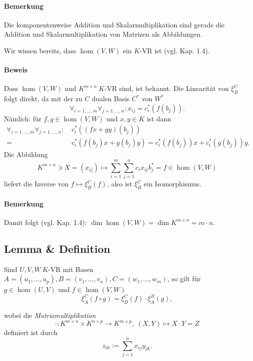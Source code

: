 \paragraph{Bemerkung}
	Die komponentenweise Addition und Skalarmultiplikation sind gerade die Addition und Skalarmultiplikation von Matrizen als Abbildungen.
	
	Wir wissen bereits, dass $ \hom(V,W) $ ein $ K $-VR ist (vgl. Kap. 1.4).
\paragraph{Beweis}
	Dass $ \hom(V,W) $ und $ K^{m\times n} \ K $-VR sind, ist bekannt. Die Linearität von $ \xi_B^C $ folgt direkt, da mit der zu $ C $ dualen Basis $ C^* $ von $ W^* $
		\[ \forall_{i=1,\dots,m} \forall_{j=1,\dots,n}: x_{ij}= c_i^*(f(b_j)). \]
	Nämlich: für $ f,g\in \hom(V,W) $ und $ x,y\in K $ ist dann
		\begin{align*}
			\forall_{i= 1,\dots,m} \forall_{j=1,\dots, n} :\ &c_i^*((fx+gy)(b_j))\\
			=\ &c_i^*(f(b_j)x+g(b_j)y) = c_i^*(f(b_j))x+c_i^*(g(b_j))y.
		\end{align*}
	Die Abbildung
		\[ K^{m\times n}\ni X=(x_{ij})\mapsto \sum_{i=1}^{m}\sum_{j=1}^{n}c_ix_{ij}b_j^* = f\in \hom(V,W) \]
	liefert die Inverse von $ f\mapsto\xi_B^C(f) $, also ist $ \xi_B^C $ ein Isomorphismus.
\paragraph{Bemerkung}
	Damit folgt (vgl. Kap. 1.4): $ \dim \hom(V,W) = \dim K^{m\times n} = m\cdot n $.
\subsection{Lemma \& Definition}
	\begin{Lemma}
	Sind $ U,V,W \ K$-VR mit Basen $ A=(u_1,\dots,u_p),B=(v_1,\dots,v_n),C=(w_1,\dots,w_m) $, so gilt für $ g\in \hom(U,V) $ und $ f\in \hom(V,W) $
		\[ \xi_A^C(f\circ g) = \xi_B^C(f)\cdot \xi_A^B(g), \]
	\end{Lemma}
	\begin{Definition}
	wobei die \emph{Matrixmultiplikation}
		\[ \cdot:K^{m\times n}\times K^{n\times p} \to K^{m\times p},\ (X,Y)\mapsto X\cdot Y = Z \]
	definiert ist durch
		\[ z_{ik} := \sum_{j=1}^{n}x_{ij}y_{jk}. \]
	\end{Definition}
